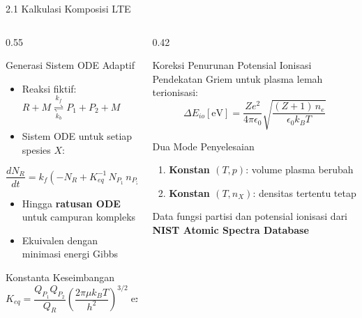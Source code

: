 \documentclass[aspectratio=169, 10pt]{beamer}
\begin{document}
\begin{frame}{2.1 Kalkulasi Komposisi LTE}
  \begin{columns}[T]
    \begin{column}{0.55\textwidth}
      \begin{block}{Generasi Sistem ODE Adaptif}
        \begin{itemize}
          \item Reaksi fiktif: $R + M \underset{k_b}{\overset{k_f}{\rightleftharpoons}} P_1 + P_2 + M$
          \item Sistem ODE untuk setiap spesies $X$:
        \end{itemize}
        \vspace{2pt}
        \begin{equation}
          \frac{dN_R}{dt} = k_f\left(-N_R + K_{eq}^{-1}\,N_{P_1}\,n_{P_2}\,n_M\right) \tag{3a}
        \end{equation}
        \begin{itemize}
          \item Hingga \textbf{ratusan ODE} untuk campuran kompleks
          \item Ekuivalen dengan minimasi energi Gibbs
        \end{itemize}
      \end{block}
      \begin{exampleblock}{Konstanta Keseimbangan}
        \small
        \begin{equation}
          K_{eq} = \frac{Q_{P_1}Q_{P_2}}{Q_R}\left(\frac{2\pi\mu k_BT}{h^2}\right)^{3/2}
          \exp\!\left(\!-\frac{\delta_{r,io}E_{io}^c + \delta_{r,di}E_{di}}{k_BT}\right)
        \end{equation}
      \end{exampleblock}
    \end{column}
    \begin{column}{0.42\textwidth}
      \begin{alertblock}{Koreksi Penurunan Potensial Ionisasi}
        \small Pendekatan Griem untuk plasma lemah terionisasi:
        \begin{equation}
          \Delta E_{io}[\text{eV}] = \frac{Ze^2}{4\pi\epsilon_0}\sqrt{\frac{(Z+1)\,n_e}{\epsilon_0 k_B T}}
        \end{equation}
      \end{alertblock}
      \vspace{6pt}
      \begin{block}{Dua Mode Penyelesaian}
        \begin{enumerate}\small
          \item \textbf{Konstan $(T, p)$}: volume plasma berubah
          \item \textbf{Konstan $(T, n_X)$}: densitas tertentu tetap
        \end{enumerate}
      \end{block}
      \vspace{4pt}
      {\scriptsize Data fungsi partisi dan potensial ionisasi dari \textbf{NIST Atomic Spectra Database}}
    \end{column}
  \end{columns}
\end{frame}
\end{document}
